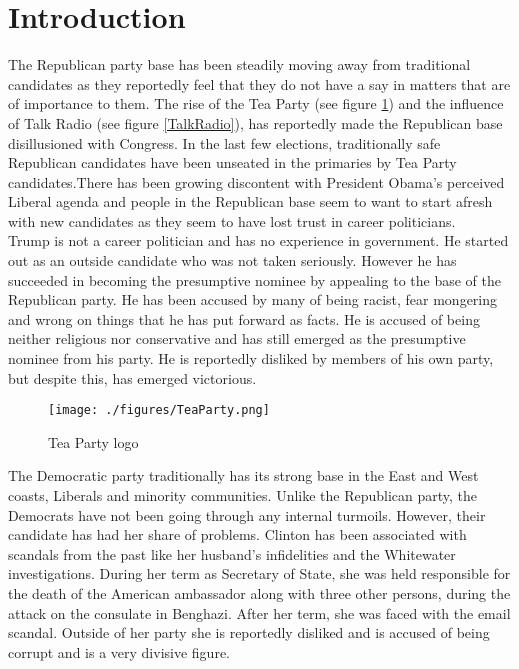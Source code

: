 \documentclass{sig-alternate-05-2015}
\begin{document}
%
%

%
%


\section{Introduction}

The Republican party base has been steadily moving away from traditional candidates as they reportedly feel that they do not have a say in matters that are of importance to them. The rise of the Tea Party (see figure \ref{TeaParty}) and the influence of Talk Radio (see figure \ref{TalkRadio}), has reportedly made the Republican base disillusioned with Congress. In the last few elections, traditionally safe Republican candidates have been unseated in the primaries by Tea Party candidates.There has been growing discontent with President Obama's perceived Liberal agenda and people in the Republican base seem to want to start afresh with new candidates as they seem to have lost trust in career politicians.\\

Trump is not a career politician and has no experience in government. He started out as an outside candidate who was not taken seriously. However he has succeeded in becoming the presumptive nominee by appealing to the base of the Republican party. He has been accused by many of being racist, fear mongering and wrong on things that he has put forward as facts. He is accused of being neither religious nor conservative and has still emerged as the presumptive nominee from his party. He is reportedly disliked by members of his own party, but despite this, has emerged victorious.\\

\begin{figure}[!t]
\centering
\texttt{[image: ./figures/TeaParty.png]}
\caption{Tea Party logo}
\label{TeaParty}
\end{figure}

The Democratic party traditionally has its strong base in the East and West coasts, Liberals and minority communities. Unlike the Republican party, the Democrats have not been going through any internal turmoils. However, their candidate has had her share of problems. Clinton has been associated with scandals from the past like her husband's infidelities and the Whitewater investigations. During her term as Secretary of State, she was held responsible for the death of the American ambassador along with three other persons, during the attack on the consulate in Benghazi. After her term, she was faced with the email scandal. Outside of her party she is reportedly disliked and is accused of being corrupt and is a very divisive figure.\\
\end{document}
